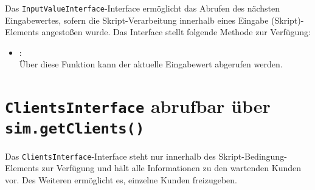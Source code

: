 Das \texttt{InputValueInterface}-Interface ermöglicht das Abrufen des nächsten Eingabewertes,
sofern die Skript-Verarbeitung innerhalb eines Eingabe (Skript)-Elements
angestoßen wurde. Das Interface stellt folgende Methode zur Verfügung:

\begin{itemize}
\item
{}:\\
Über diese Funktion kann der aktuelle Eingabewert abgerufen werden.
\end{itemize}



\chapter{\texttt{ClientsInterface} abrufbar über \texttt{sim.getClients()}}

Das \texttt{ClientsInterface}-Interface steht nur innerhalb des Skript-Bedingung-Elements zur Verfügung
und hält alle Informationen zu den wartenden Kunden vor. Des Weiteren ermöglicht es, einzelne Kunden freizugeben.

